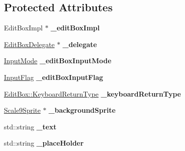 \subsection*{Protected Attributes}
\begin{DoxyCompactItemize}
\item 
\mbox{\label{classui_1_1EditBox_a376f1c6cab670b368040c1e87817d935}} 
Edit\+Box\+Impl $\ast$ {\bfseries \+\_\+edit\+Box\+Impl}
\item 
\mbox{\label{classui_1_1EditBox_a89fd5aed3c5d175555e879b78ab58c30}} 
\hyperlink{classui_1_1EditBoxDelegate}{Edit\+Box\+Delegate} $\ast$ {\bfseries \+\_\+delegate}
\item 
\mbox{\label{classui_1_1EditBox_aa2601db3a423757fa09363fbf532e407}} 
\hyperlink{classui_1_1EditBox_a7a1bfe8f3ba218bedfcf5451ec3ce01a}{Input\+Mode} {\bfseries \+\_\+edit\+Box\+Input\+Mode}
\item 
\mbox{\label{classui_1_1EditBox_add01c7f758afe8517e9c6f421de2123d}} 
\hyperlink{classui_1_1EditBox_af02f13ee9fba51d59bb3111e200848c8}{Input\+Flag} {\bfseries \+\_\+edit\+Box\+Input\+Flag}
\item 
\mbox{\label{classui_1_1EditBox_a5a90079bc9b174624363d871374d215d}} 
\hyperlink{classui_1_1EditBox_a1e1285b6f742975b26bdeb8108ca6e51}{Edit\+Box\+::\+Keyboard\+Return\+Type} {\bfseries \+\_\+keyboard\+Return\+Type}
\item 
\mbox{\label{classui_1_1EditBox_a410a1e06770fa4dacda84ddb878edf0b}} 
\hyperlink{classui_1_1Scale9Sprite}{Scale9\+Sprite} $\ast$ {\bfseries \+\_\+background\+Sprite}
\item 
\mbox{\label{classui_1_1EditBox_a05bec2be71da7ba81b50de27dd99a673}} 
std\+::string {\bfseries \+\_\+text}
\item 
\mbox{\label{classui_1_1EditBox_ad01dc8cab55a6d2ac03561cbfd45d6a6}} 
std\+::string {\bfseries \+\_\+place\+Holder}
\item 
\mbox{\label{classui_1_1EditBox_ae766e03307e677668fbb56585be599bc}} 

\end{DoxyCompactItemize}
